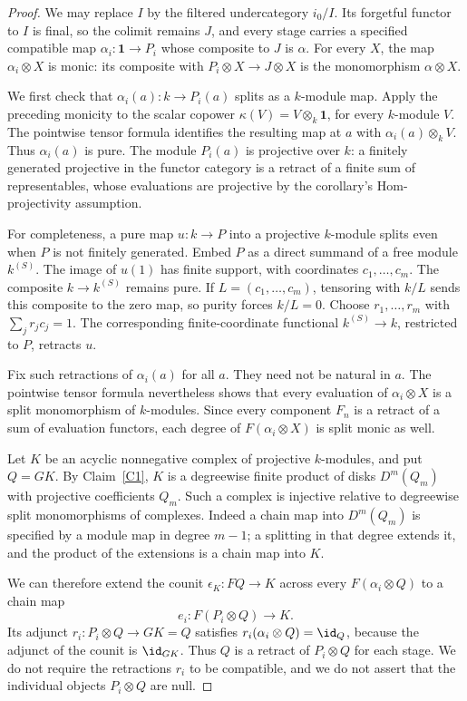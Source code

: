 \begin{proof}
We may replace $I$ by the filtered undercategory $i_0/I$. Its forgetful functor to $I$ is final, so the colimit remains $J$, and every stage carries a specified compatible map $\alpha_i:\mathbf1\to P_i$ whose composite to $J$ is $\alpha$. For every $X$, the map $\alpha_i\otimes X$ is monic: its composite with $P_i\otimes X\to J\otimes X$ is the monomorphism $\alpha\otimes X$.

We first check that $\alpha_i(a):k\to P_i(a)$ splits as a $k$-module map. Apply the preceding monicity to the scalar copower $\kappa(V)=V\otimes_k\mathbf1$, for every $k$-module $V$. The pointwise tensor formula identifies the resulting map at $a$ with $\alpha_i(a)\otimes_kV$. Thus $\alpha_i(a)$ is pure. The module $P_i(a)$ is projective over $k$: a finitely generated projective in the functor category is a retract of a finite sum of representables, whose evaluations are projective by the corollary's Hom-projectivity assumption.

For completeness, a pure map $u:k\to P$ into a projective $k$-module splits even when $P$ is not finitely generated. Embed $P$ as a direct summand of a free module $k^{(S)}$. The image of $u(1)$ has finite support, with coordinates $c_1,\ldots,c_m$. The composite $k\to k^{(S)}$ remains pure. If $L=(c_1,\ldots,c_m)$, tensoring with $k/L$ sends this composite to the zero map, so purity forces $k/L=0$. Choose $r_1,\ldots,r_m$ with $\sum_jr_jc_j=1$. The corresponding finite-coordinate functional $k^{(S)}\to k$, restricted to $P$, retracts $u$.

Fix such retractions of $\alpha_i(a)$ for all $a$. They need not be natural in $a$. The pointwise tensor formula nevertheless shows that every evaluation of $\alpha_i\otimes X$ is a split monomorphism of $k$-modules. Since every component $F_n$ is a retract of a sum of evaluation functors, each degree of $F(\alpha_i\otimes X)$ is split monic as well.

Let $K$ be an acyclic nonnegative complex of projective $k$-modules, and put $Q=GK$. By Claim~\ref{C1}, $K$ is a degreewise finite product of disks $D^m(Q_m)$ with projective coefficients $Q_m$. Such a complex is injective relative to degreewise split monomorphisms of complexes. Indeed a chain map into $D^m(Q_m)$ is specified by a module map in degree $m-1$; a splitting in that degree extends it, and the product of the extensions is a chain map into $K$.

We can therefore extend the counit $\epsilon_K:FQ\to K$ across every $F(\alpha_i\otimes Q)$ to a chain map
\[
 e_i:F(P_i\otimes Q)\longrightarrow K.
\]
Its adjunct $r_i:P_i\otimes Q\to GK=Q$ satisfies $r_i(\alpha_i\otimes Q)=\id_Q$, because the adjunct of the counit is $\id_{GK}$. Thus $Q$ is a retract of $P_i\otimes Q$ for each stage. We do not require the retractions $r_i$ to be compatible, and we do not assert that the individual objects $P_i\otimes Q$ are null.


\end{proof}
